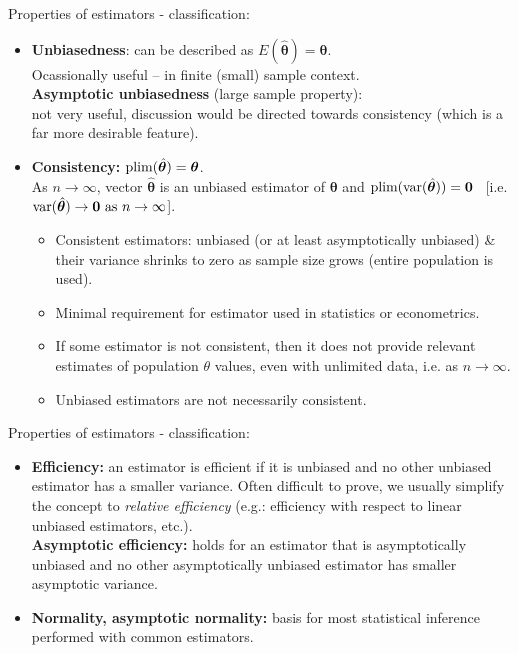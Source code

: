 \documentclass{beamer}
\begin{document}
\begin{frame}{Properties of estimators - classification:}
\small 
\medskip
\begin{itemize}
\item \textbf{Unbiasedness}: can be described as $E(\hat{\bm{\theta}})= \bm{\theta}$. \\Ocassionally useful -- in finite (small) sample context. \\
\textbf{Asymptotic unbiasedness} (large sample property): \\not very useful, discussion would be directed towards consistency (which is a far more desirable feature).
\medskip
\item \textbf{Consistency:} $\textnormal{plim}(\hat{\bm{\theta}}) = \bm{\theta}$. \\
As $n \rightarrow \infty$, vector $\hat{\bm{\theta}}$ is an unbiased estimator of $\bm{\theta}$ and $\textnormal{plim}(\textnormal{var}(\hat{\bm{\theta}}))=\bm{0}$ ~[i.e. $\textnormal{var}(\hat{\bm{\theta}}) \rightarrow \bm{0} \textnormal{ as } n \rightarrow \infty$].
\begin{itemize}
\item Consistent estimators: unbiased (or at least asymptotically unbiased) \& their variance shrinks to zero as sample size grows (entire population is used).
\item Minimal requirement for estimator used in statistics or econometrics.
\item If some estimator is not consistent, then it does not provide relevant estimates of population $\theta$ values, even with unlimited data, i.e. as $n \rightarrow \infty$.
\item Unbiased estimators are not necessarily consistent. 
\end{itemize}
\end{itemize}
\end{frame}
\begin{frame}{Properties of estimators - classification:}
\medskip
\begin{itemize}
\item \textbf{Efficiency:} an estimator is efficient if it is unbiased and no other unbiased estimator has a smaller variance. Often difficult to prove, we usually simplify the concept to \textit{relative efficiency} (e.g.: efficiency with respect to linear unbiased estimators, etc.).\\ \smallskip \textbf{Asymptotic efficiency:} holds for an estimator that is asymptotically unbiased and no other asymptotically unbiased estimator has smaller asymptotic variance.
\bigskip
\item \textbf{Normality, asymptotic normality:} basis for most statistical inference performed with common estimators. 
\end{itemize}
\end{frame}
\end{document}
